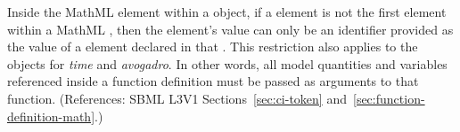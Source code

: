 Inside the  MathML element within a \FunctionDefinition
object, if a  element is not the first element within a MathML
, then the  element's value can only be an
identifier provided as the value of a  element declared in that
.  This restriction also applies to the 
objects for \emph{time} and \emph{avogadro}.  In other words, all model
quantities and variables referenced inside a function definition must be
passed as arguments to that function.  (References: SBML L3V1
Sections~\ref{sec:ci-token} and~\ref{sec:function-definition-math}.)
